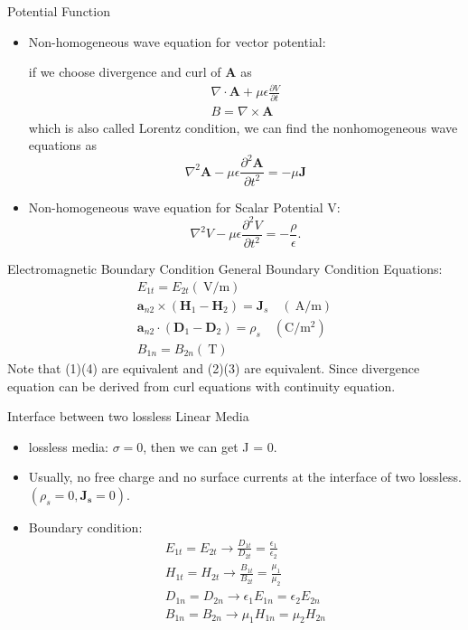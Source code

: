 \documentclass[xcolor={dvipsnames}]{beamer}
\begin{document}
\begin{frame}{Potential Function}
\begin{itemize}
	\item Non-homogeneous wave equation for vector potential:
	
	if we choose divergence and curl of \textbf{A} as 
	\[
	\begin{array}{c}
\nabla \cdot \mathbf{A}+\mu \epsilon \frac{\partial V}{\partial t} \\
B=\nabla \times \mathbf{A}
\end{array}
	\]
	which is also called Lorentz condition, we can find the nonhomogeneous wave equations as
	$$\nabla^{2} \mathbf{A}-\mu \epsilon \frac{\partial^{2} \mathbf{A}}{\partial t^{2}}=-\mu \mathbf{J}$$
	\item Non-homogeneous wave equation for Scalar Potential V:
	$$\nabla^{2} V-\mu \epsilon \frac{\partial^{2} V}{\partial t^{2}}=-\frac{\rho}{\epsilon}.$$
\end{itemize}
\end{frame}
\begin{frame}{Electromagnetic Boundary Condition}
General Boundary Condition Equations:
\[
\begin{array}{c}
E_{1 t}=E_{2 t}(\mathrm{~V} / \mathrm{m}) \\
\mathbf{a}_{n 2} \times\left(\mathbf{H}_{1}-\mathbf{H}_{2}\right)=\mathbf{J}_{s} \quad(\mathrm{~A} / \mathrm{m}) \\
\mathbf{a}_{n 2} \cdot\left(\mathbf{D}_{1}-\mathbf{D}_{2}\right)=\rho_{s} \quad\left(\mathrm{C} / \mathrm{m}^{2}\right) \\
B_{1 n}=B_{2 n}(\mathrm{~T})
\end{array}
\]
Note that (1)(4) are equivalent and (2)(3) are equivalent. Since divergence equation can be derived
from curl equations with continuity equation.
\end{frame}
\begin{frame}{Interface between two lossless Linear Media}
\begin{itemize}
	\item lossless media: $\sigma=0$, then we can get J = 0.
	\item Usually, no free charge and no surface currents at the interface of two lossless. $\left(\rho_{s}=0, \mathbf{J}_{\mathbf{s}}=0\right)$.
	\item Boundary condition:
	\[
	\begin{array}{l}
E_{1 t}=E_{2 t} \rightarrow \frac{D_{1 t}}{D_{2 t}}=\frac{\epsilon_{1}}{\epsilon_{2}} \\
H_{1 t}=H_{2 t} \rightarrow \frac{B_{1 t}}{B_{2 t}}=\frac{\mu_{1}}{\mu_{2}} \\
D_{1 n}=D_{2 n} \rightarrow \epsilon_{1} E_{1 n}=\epsilon_{2} E_{2 n} \\
B_{1 n}=B_{2 n} \rightarrow \mu_{1} H_{1 n}=\mu_{2} H_{2 n}
\end{array}
	\]
\end{itemize}
\end{frame}
\end{document}
